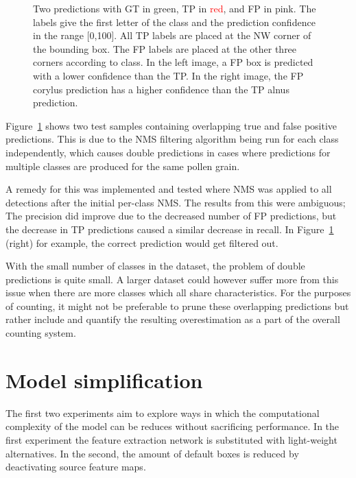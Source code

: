 \begin{figure}[htbp]
\begin{subfigure}[t]{0.4\textwidth}
  \end{subfigure}
  \caption[Predictions showing TP overlapped by FP from different class]{Two predictions with GT in \textcolor{nicegreen}{green}, TP in \textcolor{red}{red}, and FP in \textcolor{nicepink}{pink}.
The labels give the first letter of the class and the prediction confidence in the range [0,100].
All TP labels are placed at the NW corner of the bounding box.
The FP labels are placed at the other three corners according to class.
In the left image, a FP box is predicted with a lower confidence than the TP\@.
In the right image, the FP corylus prediction has a higher confidence than the TP alnus prediction.}\label{fig:results-overlapping-predictions}
\end{figure}

Figure~\ref{fig:results-overlapping-predictions} shows two test samples containing overlapping true and false positive predictions.
This is due to the NMS filtering algorithm being run for each class independently, which causes double predictions in cases where predictions for multiple classes are produced for the same pollen grain.

A remedy for this was implemented and tested where NMS was applied to all detections after the initial per-class NMS\@.
The results from this were ambiguous; The precision did improve due to the decreased number of FP predictions, but the decrease in TP predictions caused a similar decrease in recall.
In Figure~\ref{fig:results-overlapping-predictions} (right) for example, the correct prediction would get filtered out.

With the small number of classes in the dataset, the problem of double predictions is quite small.
A larger dataset could however suffer more from this issue when there are more classes which all share characteristics.
For the purposes of counting, it might not be preferable to prune these overlapping predictions but rather include and quantify the resulting overestimation as a part of the overall counting system.

\section{Model simplification}\label{sec:results-simplification}
The first two experiments aim to explore ways in which the computational complexity of the model can be reduces without sacrificing performance.
In the first experiment the feature extraction network is substituted with light-weight alternatives.
In the second, the amount of default boxes is reduced by deactivating source feature maps.

